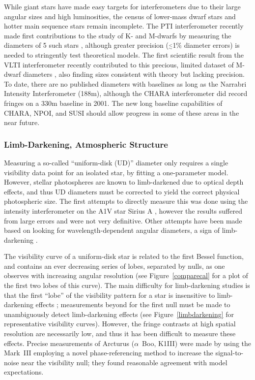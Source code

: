 \documentclass[12pt]{article}
\newcommand{\simle}{\mbox{$\stackrel{<}{_{\sim}}$}}
\begin{document}
While giant stars have made easy targets for
interferometers due to their large angular sizes and high
luminosities, the census of lower-mass dwarf stars and hotter main
sequence stars remain incomplete.  The PTI interferometer recently
made first contributions to the study of K- and M-dwarfs by measuring
the diameters of 5 such stars \citep{lane2001a}, although greater
precision ($\simle$1\% diameter errors) is needed to stringently test
theoretical models.  The first scientific result from the VLTI
interferometer recently contributed to this precious, limited dataset
of M-dwarf diameters \citep{segransan2003}, also finding sizes
consistent with theory but lacking precision.  To date, there are no
published diameters with baselines as long as the Narrabri Intensity
Interferometer (188m), although the CHARA interferometer did record
fringes on a 330m baseline in 2001.  The new long baseline
capabilities of CHARA, NPOI, and SUSI should allow progress in some of
these areas in the near future.
 
\subsubsection{Limb-Darkening, Atmospheric Structure}
Measuring a so-called ``uniform-disk (UD)'' diameter only requires a single
visibility data point for an isolated star, by fitting a one-parameter
model.  However, stellar photospheres are known to limb-darkened due
to optical depth effects, and thus  UD diameters
must be corrected to yield the correct physical photospheric size. The
first attempts to directly measure this was done using the intensity
interferometer on the A1V star Sirius A \citep{hanburybrown1974b}, however the
results suffered from large errors and were not very definitive.
Other attempts have been made based on looking for wavelength-dependent
angular diameters, a sign of limb-darkening \citep[e.g.,][]{ridgway1982,mozurk1991}.

The visibility curve of a uniform-disk star is related to the first
Bessel function, and contains an ever decreasing series of lobes,
separated by nulls, as one observes with increasing angular resolution
(see Figure~\ref{comparecal} for a plot of the first two lobes of this
curve).  The main difficulty for limb-darkening studies is that the
first ``lobe'' of the visibility pattern for a star is insensitive to
limb-darkening effects \citep[mathematically, it probes only the 2nd
moment of the brightness distribution; see][]{lachaume2003};
measurements beyond for the first null must be made to unambiguously
detect limb-darkening effects (see Figure~\ref{limbdarkening} for
representative visibility curves).  However, the fringe contrasts at
high spatial resolution are necessarily low, and thus it has been
difficult to measure these effects.  Precise
measurements of Arcturus ($\alpha$~Boo, K1III) were made by
\citet{quirrenbach1996} using the Mark~III employing a novel
phase-referencing method to increase the signal-to-noise near the
visibility null; they found reasonable agreement with model
expectations.
\end{document}
